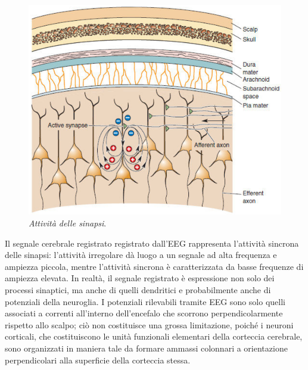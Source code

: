 \documentclass{report}
\numberwithin{equation}{section}
\numberwithin{figure}{section}
\begin{document}
\begin{figure}[htp]
    \centering
    \includegraphics[scale=0.55]{immagini/eeg.png}
    \caption{\label{fig:eeg} \textit{Attività delle sinapsi}.}
\end{figure}

Il segnale cerebrale registrato registrato dall'EEG rappresenta l'attività sincrona delle sinapsi: l'attività irregolare dà luogo a un segnale ad alta frequenza e ampiezza piccola, mentre l'attività sincrona è caratterizzata da basse frequenze di ampiezza elevata. In realtà, il segnale registrato è espressione non solo dei processi sinaptici, ma anche di quelli dendritici e probabilmente anche di potenziali della neuroglia. I potenziali rilevabili tramite EEG sono solo quelli associati a correnti all'interno dell'encefalo che scorrono perpendicolarmente rispetto allo scalpo; ciò non costituisce una grossa limitazione, poiché i neuroni corticali, che costituiscono le unità funzionali elementari della corteccia cerebrale, sono organizzati in maniera tale da formare ammassi colonnari a orientazione perpendicolari alla superficie della corteccia stessa.
\end{document}
